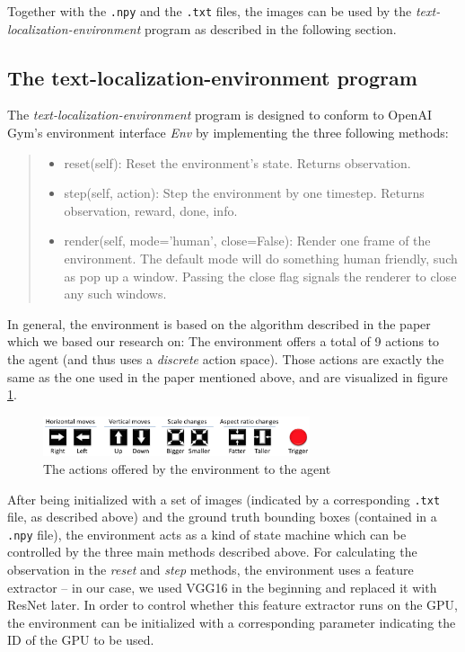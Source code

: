 \noindent Together with the \texttt{.npy} and the \texttt{.txt} files, the images can be used by the \textit{text-localization-environment} program as described in the following section.

\subsection{The text-localization-environment program}

The \textit{text-localization-environment} program is designed to conform to OpenAI Gym's environment interface \textit{Env}\cite{OpenAIGym} by implementing the three following methods:
\begin{quote}
    \begin{itemize}
        \item reset(self): Reset the environment's state. Returns observation.
        \item step(self, action): Step the environment by one timestep. Returns observation, reward, done, info.
        \item render(self, mode='human', close=False): Render one frame of the environment. The default mode will do something human friendly, such as pop up a window. Passing the close flag signals the renderer to close any such windows.
    \end{itemize}\cite{OpenAIGymReadme}
\end{quote}
In general, the environment is based on the algorithm described in the paper\cite{caicedo2015active} which we based our research on:
The environment offers a total of 9 actions to the agent (and thus uses a \textit{discrete} action space).
Those actions are exactly the same as the one used in the paper mentioned above, and are visualized in figure \ref{fig:environment-actions-from-base-paper}.

\begin{figure}[h!]
    \centering
    \includegraphics[width=0.7\textwidth]{figures/environment-actions-from-base-paper.png}
    \caption{The actions offered by the environment to the agent\cite{caicedo2015active}}
    \label{fig:environment-actions-from-base-paper}
\end{figure}

After being initialized with a set of images (indicated by a corresponding \texttt{.txt} file, as described above) and the ground truth bounding boxes (contained in a \texttt{.npy} file), the environment acts as a kind of state machine which can be controlled by the three main methods described above. 
For calculating the observation in the \textit{reset} and \textit{step} methods, the environment uses a feature extractor – in our case, we used VGG16\cite{VGG16} in the beginning and replaced it with ResNet\cite{ResNet} later.
In order to control whether this feature extractor runs on the GPU, the environment can be initialized with a corresponding parameter indicating the ID of the GPU to be used.


